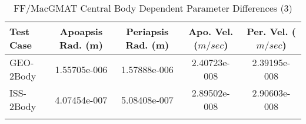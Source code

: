 \begin{table}[htbp!]
\centering
\caption{ FF/MacGMAT Central Body Dependent Parameter Differences (3)}
      \begin{tabular}{lcccc}
      \hline\hline
          Test Case & Apoapsis Rad. (m) & Periapsis Rad. (m) & Apo. Vel. ($m/sec$) & Per. Vel. ($m/sec$) \\
         \hline
         GEO-2Body & 1.55705e-006 & 1.57888e-006 & 2.40723e-008 & 2.39195e-008 \\
         ISS-2Body & 4.07454e-007 & 5.08408e-007 & 2.89502e-008 & 2.90603e-008 \\
      \hline\hline
      \label{Table: FF-MacGMAT CB Parameters Set 3} 
\end{tabular}
\end{table}
